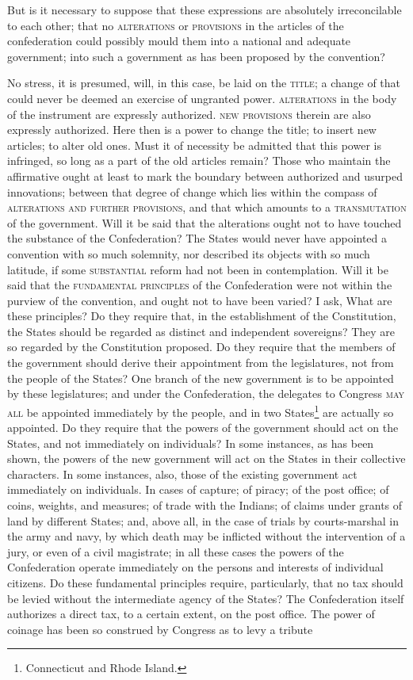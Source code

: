 But is it necessary to suppose that these expressions are absolutely irreconcilable to each other; that no \textsc{alterations} or \textsc{provisions} in the articles of the confederation could possibly mould them into a national and adequate government; into such a government as has been proposed by the convention?

No stress, it is presumed, will, in this case, be laid on the \textsc{title}; a change of that could never be deemed an exercise of ungranted power. \textsc{alterations} in the body of the instrument are expressly authorized. \textsc{new provisions} therein are also expressly authorized. Here then is a power to change the title; to insert new articles; to alter old ones. Must it of necessity be admitted that this power is infringed, so long as a part of the old articles remain? Those who maintain the affirmative ought at least to mark the boundary between authorized and usurped innovations; between that degree of change which lies within the compass of \textsc{alterations and further provisions}, and that which amounts to a \textsc{transmutation} of the government. Will it be said that the alterations ought not to have touched the substance of the Confederation? The States would never have appointed a convention with so much solemnity, nor described its objects with so much latitude, if some \textsc{substantial} reform had not been in contemplation. Will it be said that the \textsc{fundamental principles} of the Confederation were not within the purview of the convention, and ought not to have been varied? I ask, What are these principles? Do they require that, in the establishment of the Constitution, the States should be regarded as distinct and independent sovereigns? They are so regarded by the Constitution proposed. Do they require that the members of the government should derive their appointment from the legislatures, not from the people of the States? One branch of the new government is to be appointed by these legislatures; and under the Confederation, the delegates to Congress \textsc{may all} be appointed immediately by the people, and in two States\footnote{Connecticut and Rhode Island.} are actually so appointed. Do they require that the powers of the government should act on the States, and not immediately on individuals? In some instances, as has been shown, the powers of the new government will act on the States in their collective characters. In some instances, also, those of the existing government act immediately on individuals. In cases of capture; of piracy; of the post office; of coins, weights, and measures; of trade with the Indians; of claims under grants of land by different States; and, above all, in the case of trials by courts-marshal in the army and navy, by which death may be inflicted without the intervention of a jury, or even of a civil magistrate; in all these cases the powers of the Confederation operate immediately on the persons and interests of individual citizens. Do these fundamental principles require, particularly, that no tax should be levied without the intermediate agency of the States? The Confederation itself authorizes a direct tax, to a certain extent, on the post office. The power of coinage has been so construed by Congress as to levy a tribute 
